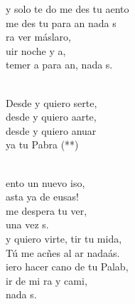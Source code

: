 \begin{cancion}%
	y solo te do  me des tu aento\\
	 me des tu  para an nada s \\
	ra ver máslaro,\\
	uir noche y a, \\
	temer a  para an, nada s. \\\jump\\
	\begin{chorus}%
	Desde y quiero serte,\\
	desde y quiero aarte,\\
	desde y quiero anuar\\
	ya tu Pabra (**)\\
	\end{chorus}%
	\jump\\
	ento un nuevo iso,\\
	asta ya de eusas!\\
	me despera tu ver,\\
	una vez s. \\
\jump
	y quiero virte, tir tu mida,\\
	 Tú me acñes al ar nadaás.\\
	iero hacer cano de tu Palab,\\
	ir de mi ra y cami,\\
	nada s. \\
\end{cancion}%
